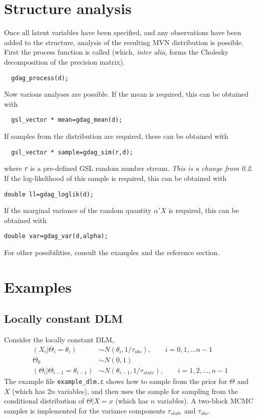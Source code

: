 \documentclass[12pt,a4paper]{article}
\begin{document}
\section{Structure analysis}

Once all latent variables have been specified, and any observations
have been added to the structure, analysis of the resulting MVN
distribution is possible. First the process function is called (which,
\emph{inter alia}, forms the Cholesky decomposition of the precision
matrix).
\begin{verbatim}
  gdag_process(d);
\end{verbatim}
Now various analyses are possible. If the mean is required, this can
be obtained with
\begin{verbatim}
  gsl_vector * mean=gdag_mean(d);
\end{verbatim}
If samples from the distribution are required, these can be obtained
with
\begin{verbatim}
  gsl_vector * sample=gdag_sim(r,d);
\end{verbatim}
where \verb$r$ is a pre-defined GSL random number stream. \emph{This
is a change from 0.2}. If the log-likelihood of this sample is required, this can be
obtained with
\begin{verbatim}
double ll=gdag_loglik(d);
\end{verbatim}
If the marginal variance of the random quantity $\alpha'X$ is
required, this can be obtained with
\begin{verbatim}
double var=gdag_var(d,alpha);
\end{verbatim}
For other possibilities, consult the examples and the reference
section.

\section{Examples} 

\subsection{Locally constant DLM}

Consider the locally constant DLM,
\begin{align*}
(X_i|\Theta_i=\theta_i) &\sim N(\theta_i,1/\tau_{obs}),\qquad
i=0,1,\ldots n-1\\
\Theta_0 &\sim N(0,1) \\
(\Theta_i|\Theta_{i-1}=\theta_{i-1}) &\sim
N(\theta_{i-1},1/\tau_{state}),\qquad i=1,2,\ldots,n-1 
\end{align*}
The example file \verb$example_dlm.c$ shows how to sample from the
prior for $\Theta$ and $X$ (which has $2n$ variables), and then uses
the sample for sampling from the conditional distribution of
$\Theta|X=x$ (which has $n$ variables). A two-block MCMC sampler is
implemented for the variance components $\tau_{state}$ and
$\tau_{obs}$. 
\end{document}
